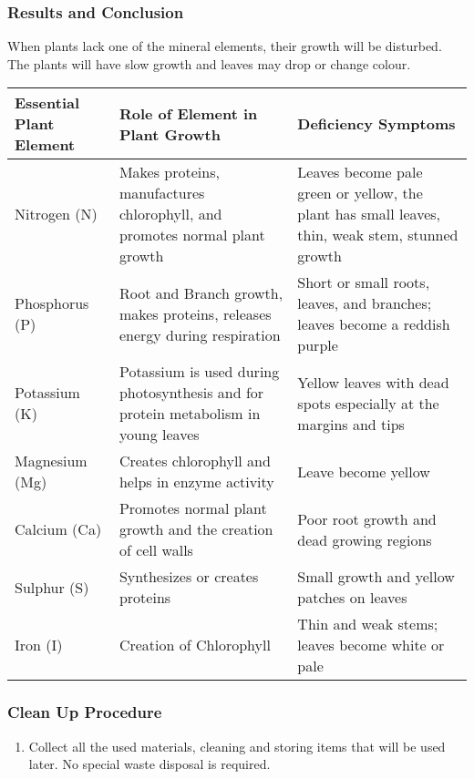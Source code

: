 \subsubsection*{Results and Conclusion}
When plants lack one of the mineral elements, their growth will be disturbed. The plants will have slow growth and leaves may drop or change colour.

\begin{tabular}{|p{3.2cm}|p{4cm}|p{4.5cm}|}
\hline \textbf{Essential Plant Element} & \textbf{Role of Element in Plant Growth} & \textbf{Deficiency Symptoms} \\ 
\hline Nitrogen (N) & Makes proteins, manufactures chlorophyll, and promotes normal plant growth & Leaves become pale green or yellow, the plant has small leaves, thin, weak stem, stunned growth\\ 
\hline Phosphorus (P) & Root and Branch growth, makes proteins, releases energy during respiration & Short or small roots, leaves, and branches; leaves become a reddish purple \\ 
\hline Potassium (K) & Potassium is used during photosynthesis and for protein metabolism in young leaves & Yellow leaves with dead spots especially at the margins and tips \\ 
\hline Magnesium (Mg) & Creates chlorophyll and helps in enzyme activity & Leave become yellow \\ 
\hline Calcium (Ca) & Promotes normal plant growth and the creation of cell walls & Poor root growth and dead growing regions \\ 
\hline Sulphur (S) & Synthesizes or creates proteins & Small growth and yellow patches on leaves \\ 
\hline Iron (I) & Creation of Chlorophyll & Thin and weak stems; leaves become white or pale \\ 
\hline 
\end{tabular} 

\subsubsection*{Clean Up Procedure}
\begin{enumerate}
\item{Collect all the used materials, cleaning and storing items that will be used later. No special waste disposal is required.}
\end{enumerate}

